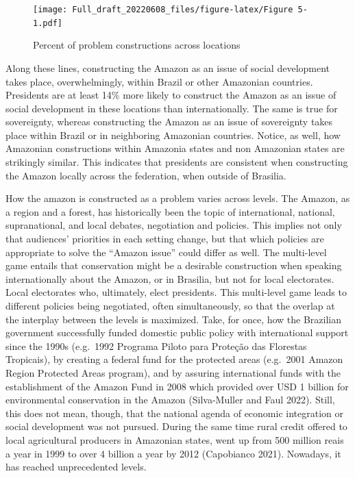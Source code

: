 \documentclass[
]{article}
\begin{document}
\begin{figure}
\centering
\texttt{[image: Full\_draft\_20220608\_files/figure-latex/Figure 5-1.pdf]}
\caption{Percent of problem constructions across locations}
\end{figure}

Along these lines, constructing the Amazon as an issue of social
development takes place, overwhelmingly, within Brazil or other
Amazonian countries. Presidents are at least 14\% more likely to
construct the Amazon as an issue of social development in these
locations than internationally. The same is true for sovereignty,
whereas constructing the Amazon as an issue of sovereignty takes place
within Brazil or in neighboring Amazonian countries. Notice, as well,
how Amazonian constructions within Amazonia states and non Amazonian
states are strikingly similar. This indicates that presidents are
consistent when constructing the Amazon locally across the federation,
when outside of Brasilia.

How the amazon is constructed as a problem varies across levels. The
Amazon, as a region and a forest, has historically been the topic of
international, national, supranational, and local debates, negotiation
and policies. This implies not only that audiences' priorities in each
setting change, but that which policies are appropriate to solve the
``Amazon issue'' could differ as well. The multi-level game entails that
conservation might be a desirable construction when speaking
internationally about the Amazon, or in Brasilia, but not for local
electorates. Local electorates who, ultimately, elect presidents. This
multi-level game leads to different policies being negotiated, often
simultaneously, so that the overlap at the interplay between the levels
is maximized. Take, for once, how the Brazilian government successfully
funded domestic public policy with international support since the 1990s
(e.g.~1992 Programa Piloto para Proteção das Florestas Tropicais), by
creating a federal fund for the protected areas (e.g.~2001 Amazon Region
Protected Areas program), and by assuring international funds with the
establishment of the Amazon Fund in 2008 which provided over USD 1
billion for environmental conservation in the Amazon (Silva-Muller and
Faul 2022). Still, this does not mean, though, that the national agenda
of economic integration or social development was not pursued. During
the same time rural credit offered to local agricultural producers in
Amazonian states, went up from 500 million reais a year in 1999 to over
4 billion a year by 2012 (Capobianco 2021). Nowadays, it has reached
unprecedented levels.
\end{document}
